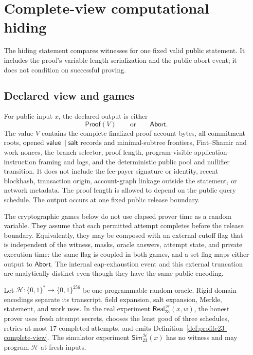 \section{Complete-view computational hiding}
\label{sec:hiding}

The hiding statement compares witnesses for one fixed valid public statement.
It includes the proof's variable-length serialization and the public abort
event; it does not condition on successful proving.

\subsection{Declared view and games}

\begin{definition}
\label{def:profile23-complete-view}
For public input \(x\), the declared output is either
\[
 \mathsf{Proof}(V)\qquad\text{or}\qquad \mathsf{Abort}.
\]
The value \(V\) contains the complete finalized proof-account bytes, all
commitment roots, opened \(\mathsf{value}\|\mathsf{salt}\) records and
minimal-subtree frontiers, Fiat--Shamir and work nonces, the branch selector,
proof length, program-visible application-instruction framing and logs, and
the deterministic public pool and nullifier transition.  It does not include
the fee-payer signature or identity, recent blockhash, transaction origin,
account-graph linkage outside the statement, or network metadata.  The proof
length is allowed to depend on the public query schedule.  The output occurs
at one fixed public release boundary.
\end{definition}

The cryptographic games below do not use elapsed prover time as a random
variable.  They assume that each permitted attempt completes before the
release boundary.  Equivalently, they may be composed with an external cutoff
flag that is independent of the witness, masks, oracle answers, attempt state,
and private execution time: the same flag is coupled in both games, and a set
flag maps either output to \(\mathsf{Abort}\).  The internal cap-exhaustion
event and this external truncation are analytically distinct even though they
have the same public encoding.

Let \(\mathcal H:\{0,1\}^*\rightarrow\{0,1\}^{256}\) be one programmable
random oracle.  Rigid domain encodings separate its transcript, field
expansion, salt expansion, Merkle, statement, and work uses.  In the real
experiment \(\mathsf{Real}_{23}^{\mathcal H}(x,w)\), the honest prover uses
fresh attempt secrets, chooses the least good of three schedules, retries at
most 17 completed attempts, and emits
Definition~\ref{def:profile23-complete-view}.  The
simulator experiment \(\mathsf{Sim}_{23}^{\mathcal H}(x)\) has no witness and
may program \(\mathcal H\) at fresh inputs.

